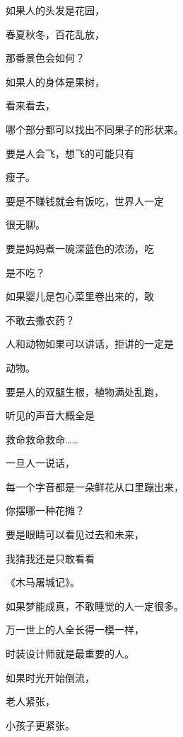 \par 如果人的头发是花园，
\par 春夏秋冬，百花乱放，
\par 那番景色会如何？
\par 
\par 如果人的身体是果树，
\par 看来看去，
\par 哪个部分都可以找出不同果子的形状来。
\par 
\par 要是人会飞，想飞的可能只有
\par 瘦子。
\par 
\par 要是不赚钱就会有饭吃，世界人一定
\par 很无聊。
\par 
\par 要是妈妈煮一碗深蓝色的浓汤，吃
\par 是不吃？
\par 
\par 如果婴儿是包心菜里卷出来的，敢
\par 不敢去撒农药？
\par 
\par 人和动物如果可以讲话，拒讲的一定是
\par 动物。
\par 
\par 要是人的双腿生根，植物满处乱跑，
\par 听见的声音大概全是
\par 救命救命救命……
\par 
\par 一旦人一说话，
\par 每一个字音都是一朵鲜花从口里蹦出来，
\par 你摆哪一种花摊？
\par 
\par 要是眼睛可以看见过去和未来，
\par 我猜我还是只敢看看
\par 《木马屠城记》。
\par 
\par 如果梦能成真，不敢睡觉的人一定很多。
\par 
\par 万一世上的人全长得一模一样，
\par 时装设计师就是最重要的人。
\par 
\par 如果时光开始倒流，
\par 老人紧张，
\par 小孩子更紧张。
